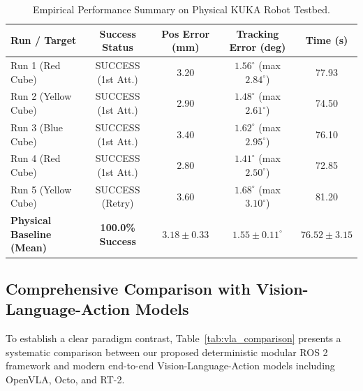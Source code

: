 \documentclass[runningheads]{llncs}
\begin{document}
\begin{table}[tb]
\caption{Empirical Performance Summary on Physical KUKA Robot Testbed.}
\label{tab:benchmark_summary}
\centering
\begin{tabular}{lcccc}
\toprule
\textbf{Run / Target} & \textbf{Success Status} & \textbf{Pos Error (mm)} & \textbf{Tracking Error (deg)} & \textbf{Time (s)} \\
\midrule
Run 1 (Red Cube) & SUCCESS (1st Att.) & 3.20 & $1.56^\circ$ (max $2.84^\circ$) & 77.93 \\
Run 2 (Yellow Cube) & SUCCESS (1st Att.) & 2.90 & $1.48^\circ$ (max $2.61^\circ$) & 74.50 \\
Run 3 (Blue Cube) & SUCCESS (1st Att.) & 3.40 & $1.62^\circ$ (max $2.95^\circ$) & 76.10 \\
Run 4 (Red Cube) & SUCCESS (1st Att.) & 2.80 & $1.41^\circ$ (max $2.50^\circ$) & 72.85 \\
Run 5 (Yellow Cube) & SUCCESS (Retry) & 3.60 & $1.68^\circ$ (max $3.10^\circ$) & 81.20 \\
\midrule
\textbf{Physical Baseline (Mean)} & \textbf{100.0\% Success} & $\mathbf{3.18 \pm 0.33}$ & $\mathbf{1.55 \pm 0.11^\circ}$ & $\mathbf{76.52 \pm 3.15}$ \\
\bottomrule
\end{tabular}
\end{table}

\subsection{Comprehensive Comparison with Vision-Language-Action Models}
To establish a clear paradigm contrast, Table~\ref{tab:vla_comparison} presents a systematic comparison between our proposed deterministic modular ROS 2 framework and modern end-to-end Vision-Language-Action models including OpenVLA, Octo, and RT-2.
\end{document}
